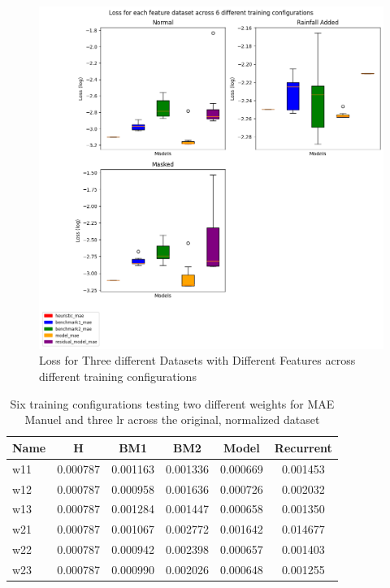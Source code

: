 \begin{figure}[tbph]
	\centering
	\includegraphics[width=0.7\linewidth, height=0.5\textheight]{Figures/Results/feature_manip/feature_manip_across_lr}
	\caption[Loss For Three different Datasets With Different Features]{Loss for Three different Datasets with Different Features across different training configurations}
	\label{fig:norm-rain-mask-init}
\end{figure}


\begin{table}[htbp]
	\centering
	\caption{Six training configurations testing two different weights for MAE Manuel and three lr across the original, normalized dataset}
	\label{tab:weighte_lr}
	\begin{tabular}{p{2cm}ccccc}
		\toprule
		Name &  H &  BM1 &  BM2 &  Model &  Recurrent \\
		\midrule
		w11 &       0.000787 &        0.001163 &        0.001336 &   0.000669 &            0.001453 \\
		w12 &       0.000787 &        0.000958 &        0.001636 &   0.000726 &            0.002032 \\
		w13 &       0.000787 &        0.001284 &        0.001447 &   0.000658 &            0.001350 \\
		w21 &       0.000787 &        0.001067 &        0.002772 &   0.001642 &            0.014677 \\
		w22 &       0.000787 &        0.000942 &        0.002398 &   0.000657 &            0.001403 \\
		w23 &       0.000787 &        0.000990 &        0.002026 &   0.000648 &            0.001255 \\
		\bottomrule
	\end{tabular}
\end{table}


